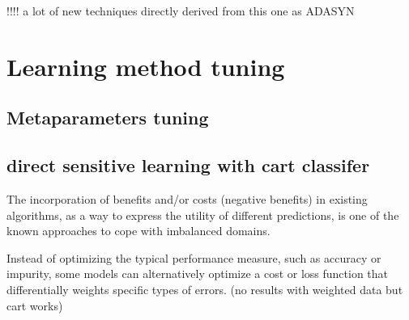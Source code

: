 \documentclass[
]{report}
\begin{document}
!!!! a lot of new techniques directly derived from this one as ADASYN

\hypertarget{learning-method-tuning}{%
\section{Learning method tuning}\label{learning-method-tuning}}

\hypertarget{metaparameters-tuning}{%
\subsection{Metaparameters tuning}\label{metaparameters-tuning}}

\hypertarget{direct-sensitive-learning-with-cart-classifer}{%
\subsection{direct sensitive learning with cart classifer}\label{direct-sensitive-learning-with-cart-classifer}}

The incorporation of beneﬁts and/or costs (negative beneﬁts) in existing algorithms, as a way to express the utility of diﬀerent predictions, is one of the known approaches to cope with imbalanced domains.

Instead of optimizing the typical performance measure, such as accuracy or impurity, some models can alternatively optimize a cost or loss function that diﬀerentially weights speciﬁc types of errors. (no results with weighted data but cart works)
\end{document}
